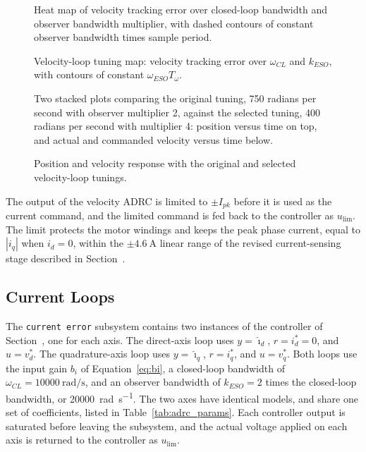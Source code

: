 \begin{figure}[htbp]
	\centering
		{Heat map of velocity tracking error over closed-loop bandwidth and observer bandwidth multiplier, with dashed contours of constant observer bandwidth times sample period.}
	\caption[Velocity-loop tuning map]{Velocity-loop tuning map: velocity tracking error over $\omega_{CL}$ and $k_{ESO}$, with contours of constant $\omega_{ESO} T_\omega$.}
	\label{fig:velocity_tuning_map}
\end{figure}
\begin{figure}[htbp]
	\centering
		{Two stacked plots comparing the original tuning, 750 radians per second with observer multiplier 2, against the selected tuning, 400 radians per second with multiplier 4: position versus time on top, and actual and commanded velocity versus time below.}
	\caption[Original and selected velocity-loop tunings]{Position and velocity response with the original and selected velocity-loop tunings.}
	\label{fig:velocity_tuning_traces}
\end{figure}

The output of the velocity ADRC is limited to $\pm I_{pk}$ before it is used as the current command, and the limited command is fed back to the controller as $u_{\mathrm{lim}}$. The limit protects the motor windings and keeps the peak phase current, equal to $|i_q|$ when $i_d = 0$, within the $\pm\SI{4.6}{\ampere}$ linear range of the revised current-sensing stage described in Section~.

\subsection{Current Loops}\label{sec:currentLoops}

The \texttt{current error} subsystem contains two instances of the
controller of Section~, one for each axis. The direct-axis loop uses $y = \hat{\imath}_d$, $r = i_d^{*} = 0$, and $u = v_d^{*}$. The quadrature-axis loop uses $y = \hat{\imath}_q$, $r = i_q^{*}$, and $u = v_q^{*}$. Both loops use the input gain $b_i$ of Equation~\eqref{eq:bi}, a closed-loop bandwidth of $\omega_{CL} = \SI{10000}{\radian\per\second}$, and an observer bandwidth of $k_{ESO} = 2$ times the closed-loop bandwidth, or \SI{20000}{\radian\per\second}. The two axes have identical models, and share one set of coefficients, listed in Table~\ref{tab:adrc_params}. Each controller output is saturated before leaving the subsystem, and the actual voltage applied on each axis is returned to the controller as $u_{\mathrm{lim}}$.


